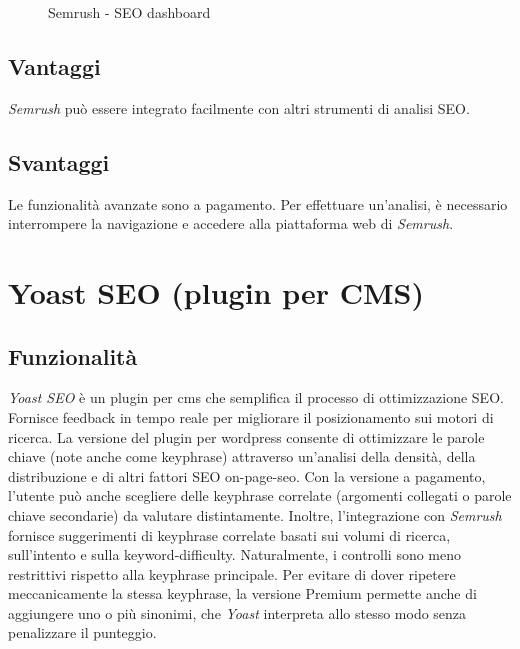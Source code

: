 \begin{figure}[H] 
    \centering 
    \caption{Semrush - SEO dashboard}
\end{figure}

\subsection{Vantaggi}
\par \textit{Semrush} può essere integrato facilmente con altri strumenti di analisi SEO.

\subsection{Svantaggi}
\par Le funzionalità avanzate sono a pagamento. Per effettuare un'analisi, è necessario interrompere la navigazione e accedere alla piattaforma web di \textit{Semrush}.

\section{Yoast SEO (plugin per CMS)}

\subsection{Funzionalità}
\par \textit{Yoast SEO} è un plugin per \gls{cms} che semplifica il processo di ottimizzazione SEO. Fornisce feedback in tempo reale per migliorare il posizionamento sui motori di ricerca. La versione del plugin per \gls{wordpress} consente di ottimizzare le parole chiave (note anche come keyphrase) attraverso un'analisi della densità, della distribuzione e di altri fattori SEO \gls{on-page-seo}. Con la versione a pagamento, l'utente può anche scegliere delle keyphrase correlate (argomenti collegati o parole chiave secondarie) da valutare distintamente. Inoltre, l'integrazione con \textit{Semrush} fornisce suggerimenti di keyphrase correlate basati sui volumi di ricerca, sull'intento e sulla \gls{keyword-difficulty}. Naturalmente, i controlli sono meno restrittivi rispetto alla keyphrase principale. Per evitare di dover ripetere meccanicamente la stessa keyphrase, la versione Premium permette anche di aggiungere uno o più sinonimi, che \textit{Yoast} interpreta allo stesso modo senza penalizzare il punteggio.

